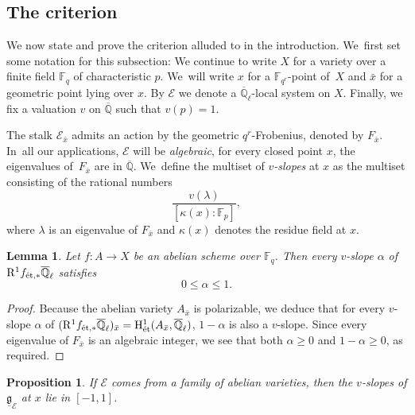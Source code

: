 \documentclass[JEP,XML,SOM,Unicode,published]{cedram}
\numberwithin{equation}{subsection}
\newtheorem{lem}[thm]{Lemma}
\newtheorem{prop}[thm]{Proposition}
\theoremstyle{definition}
\newcommand{\Qlbar}{\overline{\mathbb{Q}}_{\ell}}
\newcommand{\Q}{\mathbb Q}
\let\mc\mathcal
\begin{document}
\subsection{The criterion}\label{sec: criterion} 
We now state and prove the criterion alluded to in the introduction. We~first set some notation for this subsection: We continue to write $X$ for a variety over a finite field $\mathbb{F}_q$ of characteristic $p$. We~will write $x$ for a $\mathbb{F}_{q^r}$-point of~$X$ and $\bar x$ for a geometric point lying over $x$. By $\mc{E}$ we denote a $\Qlbar$-local system on $X$. Finally, we fix a valuation $v$ on $\overline{\Q}$ such that $v(p)=1$.

The stalk $\mathcal{E}_{\bar x}$ admits an action by the geometric $q^r$-Frobenius, denoted by $F_{\bar x}$. In~all our applications, $\mathcal{E}$ will be \emph{algebraic}, \ie for every closed point $x$, the eigenvalues of~$F_{\bar x}$ are in $\overline{\Q}$. We~define the multiset of \emph{$v$-slopes} at $x$ as the multiset consisting of the rational numbers
\[
\frac{v(\lambda)}{[\kappa(x)\colon\mathbb{F}_p]},
\]
where $\lambda$ is an eigenvalue of $F_{\bar x}$ and $\kappa(x)$ denotes the residue field at $x$.

\begin{lem}\label{cor: estimate-for-Newton-slope-of-abelian-scheme}
Let $f\colon A\to X$ be an abelian scheme over $\mathbb{F}_q$. Then every $v$-slope $\alpha$ of $\mathrm{R}^1f_{\textnormal{ét},\ast}\overline{\Q}_\ell$ satisfies
\[
0\leq\alpha\leq 1.
\]
\end{lem}

\begin{proof}
Because the abelian variety $A_{\bar x}$ is polarizable, we deduce that for every $v$\nobreakdash-slope $\alpha$ of $(\mathrm{R}^1f_{\textnormal{ét},\ast}\overline{\Q}_\ell)_{\bar x}=\mathrm{H}^1_\textnormal{ét}(A_{\bar x},\overline{\Q}_\ell)$, $1-\alpha$ is also a $v$-slope. Since every eigenvalue of $F_{\bar x}$ is an algebraic integer, we see that both $\alpha\geq 0$ and $1-\alpha\geq 0$, as required.
\end{proof}

\begin{prop}\label{prop: criterion-crystalline}
If $\mathcal{E}$ comes from a family of abelian varieties, then the $v$-slopes of $\underline{\mathfrak{g}}_{\mathcal{E}}$ at $x$ lie in $[-1,1]$.
\end{prop}
\end{document}
